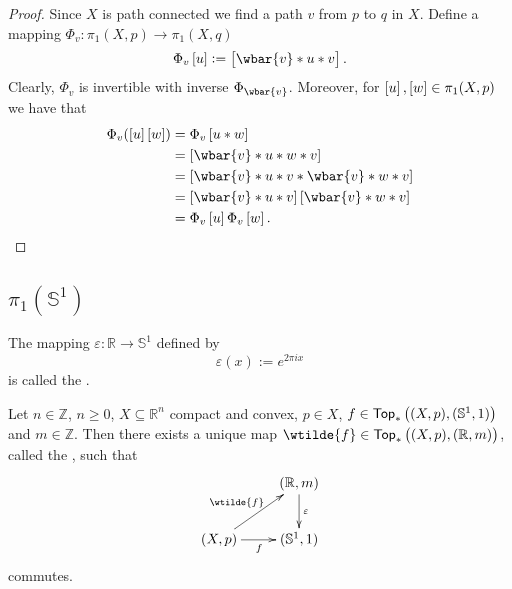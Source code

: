 \begin{proof}
	Since $X$ is path connected we find a path $v$ from $p$ to $q$ in $X$. Define a mapping $\Phi_v : \pi_1(X,p) \to \pi_1(X,q)$ 
	\begin{equation*}
		\Phi_v\sbr{u} := \sbr{\wbar{v} \ast u \ast v}.
	\end{equation*}
	Clearly, $\Phi_v$ is invertible with inverse $\Phi_{\wbar{v}}$. Moreover, for $\sbr{u},\sbr{w} \in \pi_1(X,p)$ we have that
	\begin{align*}
		\Phi_v(\sbr{u}\sbr{w}) &= \Phi_v\sbr{u \ast w}\\
		&= \sbr[0]{\wbar{v} \ast u \ast w \ast v}\\
		&= \sbr[0]{\wbar{v} \ast u \ast v \ast \wbar{v} \ast w \ast v}\\
		&= \sbr[0]{\wbar{v} \ast u \ast v}\sbr[0]{\wbar{v} \ast w \ast v}\\
		&= \Phi_v\sbr{u}\Phi_v\sbr{w}.
	\end{align*}
\end{proof}

\subsection*{$\pi_1(\mathbb{S}^1)$}  

\begin{definition}
	The mapping $\varepsilon : \mathbb{R} \to \mathbb{S}^1$ defined by
	\begin{equation}
		\varepsilon(x) := e^{2\pi i x}
	\end{equation}
	\noindent is called the .
\end{definition}

\begin{proposition}
	Let $n \in \mathbb{Z}$, $n \geq 0$, $X \subseteq \mathbb{R}^n$ compact and convex, $p \in X$, $f \in \mathsf{Top}_\ast\del[1]{(X,p),(\mathbb{S}^1,1)}$ and $m \in \mathbb{Z}$. Then there exists a unique map $\wtilde{f} \in \mathsf{Top}_\ast\del[1]{(X,p),(\mathbb{R},m)}$, called the , such that 
	\begin{equation*}
		\centering
		\xymatrix{
			& (\mathbb{R},m) \ar[d]^\varepsilon\\
			(X,p) \ar[r]_f\ar[ur]^{\wtilde{f}}	& (\mathbb{S}^1,1)
		}
		\end{equation*}
		\noindent commutes. 
		\label{prop:lifting_circle}
	\end{proposition}

